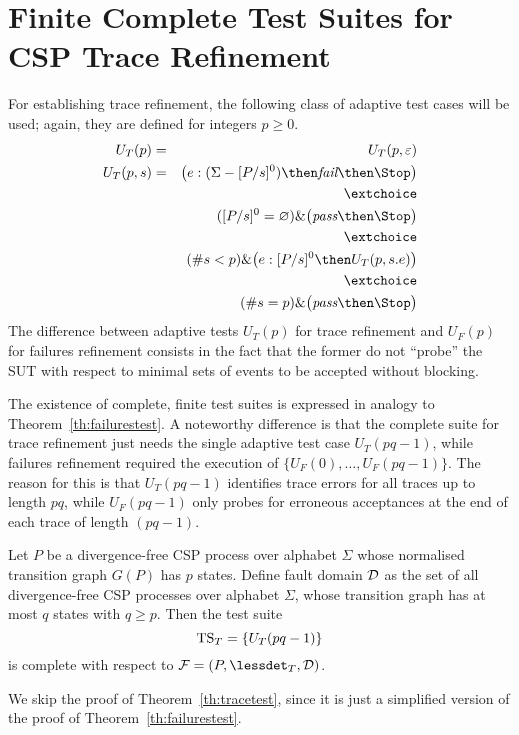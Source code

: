 \section{Finite Complete Test Suites for CSP Trace Refinement}
\label{sec:finitecomplete}

For establishing trace refinement, the following class of adaptive test cases
will be used; again, they are defined for integers $p \ge 0$.
%
\begin{eqnarray}
U_T(p) & = & U_T(p,\varepsilon)
\\
U_T(p,s) & = & \big( e:(\Sigma - [P/s]^0) \then \efail\then \Stop \big)
\label{eq:uta}
\\ & & \extchoice \nonumber
\\ & & ([P/s]^0 = \varnothing)    \&   \big( \epass \then \Stop \big)
\label{eq:utb}
\\ & & \extchoice \nonumber
\\ & & (\#s < p) \& \big( e:[P/s]^0 \then U_T(p,s.e) \big)
\label{eq:utc}
\\ & & \extchoice \nonumber
\\ & & (\#s = p) \& \big( \epass\then \Stop  \big)
\label{eq:utd}
\end{eqnarray}
%
The difference between adaptive tests $U_T(p)$ for trace refinement and
$U_F(p)$ for failures refinement consists in the fact that the former do not
``probe'' the SUT with respect to minimal sets of events to be accepted
without blocking.

The existence of complete, finite test suites is expressed in analogy to
Theorem~\ref{th:failurestest}. A noteworthy difference is that the complete
suite for trace refinement just needs the single adaptive test case
$U_T(pq-1)$, while failures refinement required the execution of $\{
U_F(0),\dots,U_F(pq-1)\}$. The reason for this is that $U_T(pq-1)$ identifies
trace errors for all traces up to length $pq$, while $U_F(pq-1)$ only probes
for erroneous acceptances at the end of each trace of length $(pq -1)$.

\begin{theorem}\label{th:tracetest}
Let $P$ be a divergence-free CSP process over alphabet $\Sigma$ whose
normalised transition graph $G(P)$ has $p$ states. Define fault domain ${\cal
D}$ as the set of all divergence-free CSP processes over alphabet $\Sigma$,
whose transition graph has at most $q$ states with $q \ge p$. Then the test
suite
\[
{\text{TS}}_T = \{ U_T(pq-1)   \}
\]
is complete with respect to ${\cal F} = (P,\lessdet_T,{\cal D})$.
\xbox
\end{theorem}
%
We skip the proof of Theorem~\ref{th:tracetest}, since it is just a
simplified version of the proof of Theorem~\ref{th:failurestest}.
